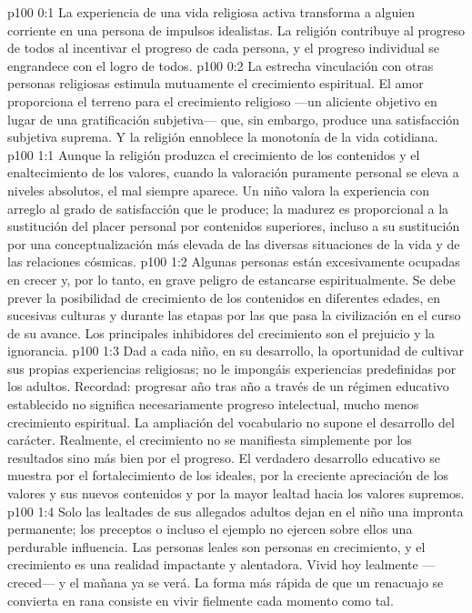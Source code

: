 \author{Melquisedec}
\vs p100 0:1 La experiencia de una vida religiosa activa transforma a alguien corriente en una persona de impulsos idealistas. La religión contribuye al progreso de todos al incentivar el progreso de cada persona, y el progreso individual se engrandece con el logro de todos.
\vs p100 0:2 La estrecha vinculación con otras personas religiosas estimula mutuamente el crecimiento espiritual. El amor proporciona el terreno para el crecimiento religioso ---un aliciente objetivo en lugar de una gratificación subjetiva--- que, sin embargo, produce una satisfacción subjetiva suprema. Y la religión ennoblece la monotonía de la vida cotidiana.
\vs p100 1:1 Aunque la religión produzca el crecimiento de los contenidos y el enaltecimiento de los valores, cuando la valoración puramente personal se eleva a niveles absolutos, el mal siempre aparece. Un niño valora la experiencia con arreglo al grado de satisfacción que le produce; la madurez es proporcional a la sustitución del placer personal por contenidos superiores, incluso a su sustitución por una conceptualización más elevada de las diversas situaciones de la vida y de las relaciones cósmicas.
\vs p100 1:2 Algunas personas están excesivamente ocupadas en crecer y, por lo tanto, en grave peligro de estancarse espiritualmente. Se debe prever la posibilidad de crecimiento de los contenidos en diferentes edades, en sucesivas culturas y durante las etapas por las que pasa la civilización en el curso de su avance. Los principales inhibidores del crecimiento son el prejuicio y la ignorancia.
\vs p100 1:3 Dad a cada niño, en su desarrollo, la oportunidad de cultivar sus propias experiencias religiosas; no le impongáis experiencias predefinidas por los adultos. Recordad: progresar año tras año a través de un régimen educativo establecido no significa necesariamente progreso intelectual, mucho menos crecimiento espiritual. La ampliación del vocabulario no supone el desarrollo del carácter. Realmente, el crecimiento no se manifiesta simplemente por los resultados sino más bien por el progreso. El verdadero desarrollo educativo se muestra por el fortalecimiento de los ideales, por la creciente apreciación de los valores y sus nuevos contenidos y por la mayor lealtad hacia los valores supremos.
\vs p100 1:4 Solo las lealtades de sus allegados adultos dejan en el niño una impronta permanente; los preceptos o incluso el ejemplo no ejercen sobre ellos una perdurable influencia. Las personas leales son personas en crecimiento, y el crecimiento es una realidad impactante y alentadora. Vivid hoy lealmente ---creced--- y el mañana ya se verá. La forma más rápida de que un renacuajo se convierta en rana consiste en vivir fielmente cada momento como tal.
